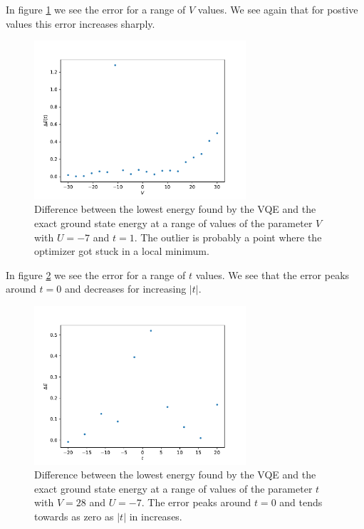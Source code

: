 \documentclass[10 pt, a4paper]{article}
\begin{document}
In figure \ref{fig:verror} we see the error for a range of $V$ values. We see again that for postive values this error increases sharply.

\begin{figure}[H]
\centering
	\includegraphics[width=0.7\textwidth]{verror}
\caption{Difference between the lowest energy found by the VQE and the exact ground state energy at a range of values of the parameter $V$ with $U = -7$ and $t = 1$. The outlier is probably a point where the optimizer got stuck in a local minimum.} \label{fig:verror}
\end{figure}


In figure \ref{fig:terror} we see the error for a range of $t$ values. We see that the error peaks around $t = 0$ and decreases for increasing $|t|$.

\begin{figure}[H]
\centering
	\includegraphics[width=0.7\textwidth]{terror}
\caption{Difference between the lowest energy found by the VQE and the exact ground state energy at a range of values of the parameter $t$ with $V = 28$ and $U = -7$. The error peaks around $t = 0$ and tends towards as zero as $|t|$ in increases.} \label{fig:terror}
\end{figure}
\end{document}
